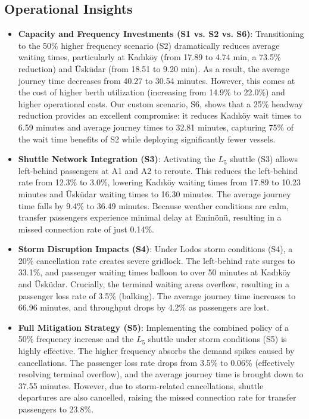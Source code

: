 \documentclass[11pt,a4paper]{article}
\begin{document}
\subsection{Operational Insights}
\begin{itemize}
    \item \textbf{Capacity and Frequency Investments (S1 vs. S2 vs. S6)}: Transitioning to the 50\% higher frequency scenario (S2) dramatically reduces average waiting times, particularly at Kad\i k\"{o}y (from 17.89 to 4.74 min, a 73.5\% reduction) and \"Usk\"{u}dar (from 18.51 to 9.20 min). As a result, the average journey time decreases from 40.27 to 30.54 minutes. However, this comes at the cost of higher berth utilization (increasing from 14.9\% to 22.0\%) and higher operational costs. Our custom scenario, S6, shows that a 25\% headway reduction provides an excellent compromise: it reduces Kad\i k\"{o}y wait times to 6.59 minutes and average journey times to 32.81 minutes, capturing 75\% of the wait time benefits of S2 while deploying significantly fewer vessels.
    \item \textbf{Shuttle Network Integration (S3)}: Activating the $L_5$ shuttle (S3) allows left-behind passengers at A1 and A2 to reroute. This reduces the left-behind rate from 12.3\% to 3.0\%, lowering Kad\i k\"{o}y waiting times from 17.89 to 10.23 minutes and \"Usk\"{u}dar waiting times to 16.30 minutes. The average journey time falls by 9.4\% to 36.49 minutes. Because weather conditions are calm, transfer passengers experience minimal delay at Emin\"{o}n\"{u}, resulting in a missed connection rate of just 0.14\%.
    \item \textbf{Storm Disruption Impacts (S4)}: Under Lodos storm conditions (S4), a 20\% cancellation rate creates severe gridlock. The left-behind rate surges to 33.1\%, and passenger waiting times balloon to over 50 minutes at Kad\i k\"{o}y and \"Usk\"{u}dar. Crucially, the terminal waiting areas overflow, resulting in a passenger loss rate of 3.5\% (balking). The average journey time increases to 66.96 minutes, and throughput drops by 4.2\% as passengers are lost.
    \item \textbf{Full Mitigation Strategy (S5)}: Implementing the combined policy of a 50\% frequency increase and the $L_5$ shuttle under storm conditions (S5) is highly effective. The higher frequency absorbs the demand spikes caused by cancellations. The passenger loss rate drops from 3.5\% to 0.06\% (effectively resolving terminal overflow), and the average journey time is brought down to 37.55 minutes. However, due to storm-related cancellations, shuttle departures are also cancelled, raising the missed connection rate for transfer passengers to 23.8\%.
\end{itemize}
\end{document}
